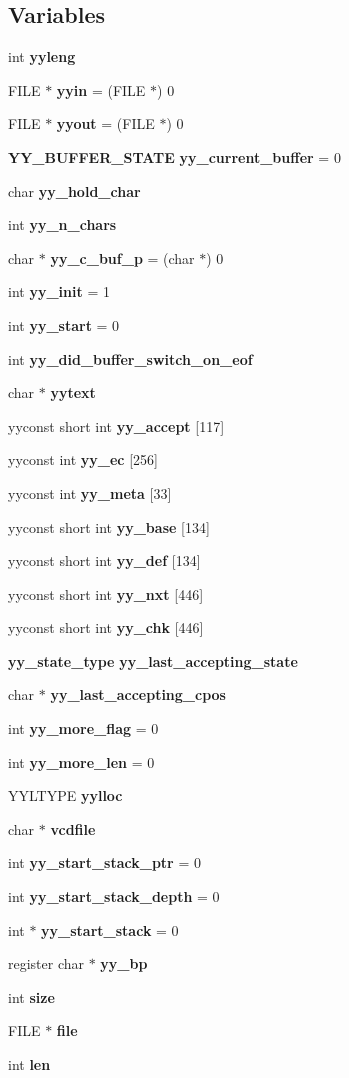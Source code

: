 \subsection*{Variables}
\begin{CompactItemize}
\item 
int {\bf yyleng}
\item 
FILE $\ast$ {\bf yyin} = (FILE $\ast$) 0
\item 
FILE $\ast$ {\bf yyout} = (FILE $\ast$) 0
\item 
{\bf YY\_\-BUFFER\_\-STATE} {\bf yy\_\-current\_\-buffer} = 0
\item 
char {\bf yy\_\-hold\_\-char}
\item 
int {\bf yy\_\-n\_\-chars}
\item 
char $\ast$ {\bf yy\_\-c\_\-buf\_\-p} = (char $\ast$) 0
\item 
int {\bf yy\_\-init} = 1
\item 
int {\bf yy\_\-start} = 0
\item 
int {\bf yy\_\-did\_\-buffer\_\-switch\_\-on\_\-eof}
\item 
char $\ast$ {\bf yytext}
\item 
yyconst short int {\bf yy\_\-accept} [117]
\item 
yyconst int {\bf yy\_\-ec} [256]
\item 
yyconst int {\bf yy\_\-meta} [33]
\item 
yyconst short int {\bf yy\_\-base} [134]
\item 
yyconst short int {\bf yy\_\-def} [134]
\item 
yyconst short int {\bf yy\_\-nxt} [446]
\item 
yyconst short int {\bf yy\_\-chk} [446]
\item 
{\bf yy\_\-state\_\-type} {\bf yy\_\-last\_\-accepting\_\-state}
\item 
char $\ast$ {\bf yy\_\-last\_\-accepting\_\-cpos}
\item 
int {\bf yy\_\-more\_\-flag} = 0
\item 
int {\bf yy\_\-more\_\-len} = 0
\item 
YYLTYPE {\bf yylloc}
\item 
char $\ast$ {\bf vcdfile}
\item 
int {\bf yy\_\-start\_\-stack\_\-ptr} = 0
\item 
int {\bf yy\_\-start\_\-stack\_\-depth} = 0
\item 
int $\ast$ {\bf yy\_\-start\_\-stack} = 0
\item 
register char $\ast$ {\bf yy\_\-bp}
\item 
int {\bf size}
\item 
FILE $\ast$ {\bf file}
\item 
int {\bf len}
\end{CompactItemize}


